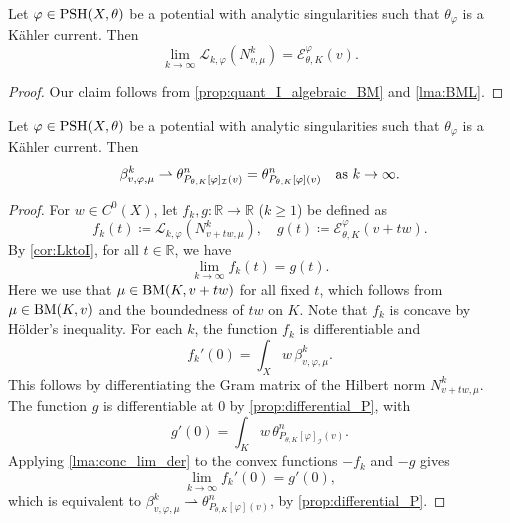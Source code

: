 \begin{corollary} \label{cor:LktoI}
Let $\varphi \in \mathrm{PSH}(X,\theta)$ be a potential with analytic singularities such that $\theta_{\varphi}$ is a Kähler current.
Then
\[
\lim_{k\to\infty}  \mathcal{L}_{k,\varphi}(N^k_{v,\mu})= \mathcal{E}_{\theta,K}^{\varphi}(v).
\]
\end{corollary}
\begin{proof}
Our claim follows from \cref{prop:quant_I_algebraic_BM} and \cref{lma:BML}.
\end{proof}


\begin{proposition}\label{prop:weakconvana}
Let $\varphi \in \mathrm{PSH}(X,\theta)$ be a potential with analytic singularities such that $\theta_{\varphi}$ is a Kähler current. Then
\[
\beta^k_{v,\varphi, \mu} \rightharpoonup \theta_{P_{\theta,K}[\varphi]_{\mathcal{I}}(v)}^n=\theta_{P_{\theta,K}[\varphi](v)}^n\quad \textup{as }k\to\infty.
\]
\end{proposition}

\begin{proof}
For $w\in C^0(X)$, let $f_k,g\colon \mathbb{R}\rightarrow \mathbb{R}$ ($k\geq 1$) be defined as
\[
f_k(t)\coloneqq \mathcal{L}_{k,\varphi}(N^k_{v+tw,\mu}),\quad g(t)\coloneqq \mathcal{E}_{\theta,K}^{\varphi}(v+tw).
\]
By \cref{cor:LktoI}, for all $t\in \mathbb{R}$, we have
\[
\lim_{k\to\infty} f_k(t)= g(t).
\]
Here we use that $\mu\in\mathrm{BM}(K,v+tw)$ for all fixed $t$, which follows from $\mu\in\mathrm{BM}(K,v)$ and the boundedness of $tw$ on $K$. Note that $f_k$ is concave by H\"older's inequality.
For each $k$, the function $f_k$ is differentiable and
\[
    f_k'(0)=\int_X w\,\beta^k_{v,\varphi,\mu}.
\]
This follows by differentiating the Gram matrix of the Hilbert norm $N^k_{v+tw,\mu}$. The function $g$ is differentiable at $0$ by \cref{prop:differential_P}, with
\[
    g'(0)=\int_K w\,\theta^n_{P_{\theta,K}[\varphi]_{\mathcal I}(v)}.
\]
Applying \cref{lma:conc_lim_der} to the convex functions $-f_k$ and $-g$ gives
\[
    \lim_{k\to\infty} f_k'(0)=g'(0),
\]
which is equivalent to $\beta^k_{v, \varphi,\mu} \rightharpoonup \theta_{P_{\theta,K}[\varphi](v)}^n$, by \cref{prop:differential_P}.
\end{proof}


